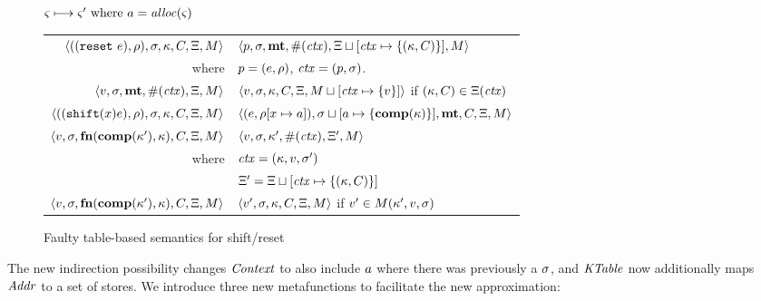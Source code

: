 \documentclass{llncs}
\begin{document}
\begin{figure}
  \centering
  $\varsigma \longmapsto \varsigma' \text{ where } a = \mathit{alloc}(\varsigma)$ \\
  \begin{tabular}{r|l}
    \hline
    $\langle ((\texttt{reset}\ e), \rho), \sigma, \kappa, C, \Xi, M \rangle$
    &
    $\langle p, \sigma, \mathbf{mt}, \#(\mathit{ctx}), \Xi\sqcup[\mathit{ctx} \mapsto \{ (\kappa,C) \}], M \rangle$
    \\
    where & $p = (e, \rho)$, $\mathit{ctx} = (p, \sigma)$.
    \\
    $\langle v, \sigma, \mathbf{mt}, \#(\mathit{ctx}), \Xi, M \rangle$
    &
    $\langle v, \sigma, {\kappa}, {C}, \Xi, M\sqcup[\mathit{ctx} \mapsto \{ v \}] \rangle$
    if $(\kappa,C) \in \Xi(\mathit{ctx})$
    \\
    $\langle ((\texttt{shift} (x) e), \rho), \sigma, \kappa, C, \Xi, M \rangle$
    &
    $\langle (e, \rho[x \mapsto a]), \sigma\sqcup[a \mapsto \{ \mathbf{comp}(\kappa) \}],\mathbf{mt},C,\Xi,M \rangle$
    \\
    $\langle v,\sigma,\mathbf{fn}{}(\mathbf{comp}(\kappa'), \kappa), C, \Xi, M \rangle$
    &
    $\langle v, \sigma, \kappa', \#(\mathit{ctx}), \Xi',M \rangle$
    \\
    where & $\mathit{ctx} = (\kappa, v, \sigma')$ \\
          & $\Xi' = \Xi\sqcup[\mathit{ctx} \mapsto \{ (\kappa,C) \}]$
    \\
    $\langle v,\sigma,\mathbf{fn}{}(\mathbf{comp}(\kappa'), \kappa), C, \Xi, M \rangle$
    &
    $\langle v', \sigma, \kappa, C, \Xi,M \rangle$ if $v' \in M(\kappa',v,\sigma)$
  \end{tabular}  
  \caption{Faulty table-based semantics for shift/reset}
  \label{fig:shift-reset-table0}
\end{figure}

The new indirection possibility changes $\mathit{Context}$ to also include
$a$ where there was previously a $\sigma$, and $\mathit{KTable}$ now
additionally maps $\mathit{Addr}$ to a set of stores. We introduce three new
metafunctions to facilitate the new approximation:
\end{document}
